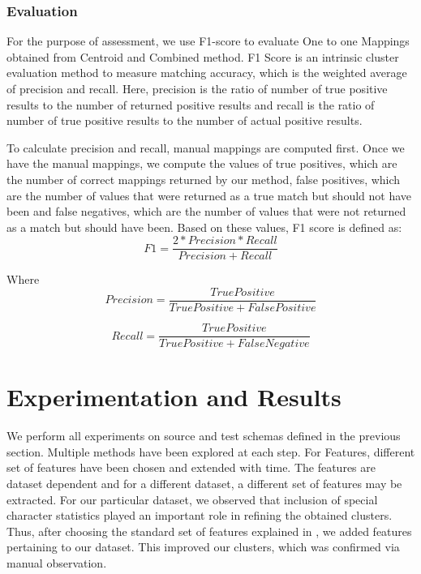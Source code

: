 \documentclass[conference]{IEEEtran}
\begin{document}
\subsubsection*{\textbf{Evaluation}}
For the purpose of assessment, we use F1-score to evaluate One to one Mappings obtained from Centroid and Combined method. F1 Score is an intrinsic cluster evaluation method to measure matching accuracy, which is the weighted average of precision and recall. Here, precision is the ratio of number of true positive results to the number of returned positive results and recall is the ratio of number of true positive results to the number of actual positive results.

To calculate precision and recall, manual mappings are computed first. Once we have the manual mappings, we compute the values of true positives, which are the number of correct mappings returned by our method, false positives, which are the number of values that were returned as a true match but should not have been and false negatives, which are the number of values that were not returned as a match but should have been. Based on these values, F1 score is defined as: 
\begin{equation}
F1 = \frac{2 * Precision * Recall}{Precision + Recall}
\end{equation}

\noindent
Where
\begin{equation}
Precision = \frac{True Positive}{True Positive + False Positive}
\end{equation}

\begin{equation}
Recall = \frac{True Positive}{True Positive + False Negative}
\end{equation}
    
\section{Experimentation and Results}
We perform all experiments on source and test schemas defined in the previous section. Multiple methods have been explored at each step. For Features, different set of features have been chosen and extended with time. The features are dataset dependent and for a different dataset, a different set of features may be extracted. For our particular dataset, we observed that inclusion of special character statistics played an important role in refining the obtained clusters. Thus, after choosing the standard set of features explained in \cite{ref1}, we added features pertaining to our dataset. This improved our clusters, which was confirmed via manual observation. 
\end{document}
